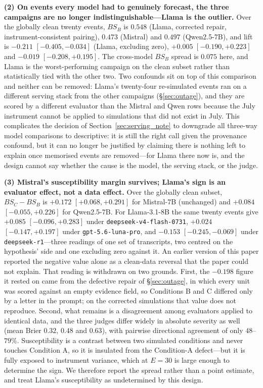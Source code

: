 \documentclass[11pt,journal,onecolumn]{IEEEtran}
\begin{document}
\textbf{(2) On events every model had to genuinely forecast, the three campaigns are no longer indistinguishable---Llama is the outlier.} Over the globally clean twenty events, $BS_B$ is $0.548$ (Llama, corrected repair, instrument-consistent pairing), $0.473$ (Mistral) and $0.497$ (Qwen2.5-7B), and lift is $-0.211$ $[-0.405, -0.034]$ (Llama, excluding zero), $+0.005$ $[-0.190, +0.223]$ and $-0.019$ $[-0.208, +0.195]$. The cross-model $BS_B$ spread is $0.075$ here, and Llama is the worst-performing campaign on the clean subset rather than statistically tied with the other two. Two confounds sit on top of this comparison and neither can be removed: Llama's twenty-four re-simulated events ran on a different serving stack from the other campaigns (\S\ref{sec:outage}), and they are scored by a different evaluator than the Mistral and Qwen rows because the July instrument cannot be applied to simulations that did not exist in July. This complicates the decision of Section~\ref{sec:serving_note} to downgrade all three-way model comparisons to descriptive: it is still the right call given the provenance confound, but it can no longer be justified by claiming there is nothing left to explain once memorised events are removed---for Llama there now is, and the design cannot say whether the cause is the model, the serving stack, or the judge.

\textbf{(3) Mistral's susceptibility margin survives; Llama's sign is an evaluator effect, not a data effect.} Over the globally clean subset, $BS_C - BS_B$ is $+0.172$ $[+0.068, +0.291]$ for Mistral-7B (unchanged) and $+0.084$ $[-0.055, +0.226]$ for Qwen2.5-7B. For Llama-3.1-8B the same twenty events give $+0.085$ $[-0.096, +0.283]$ under \texttt{deepseek-v4-flash-0731}, $+0.024$ $[-0.147, +0.197]$ under \texttt{gpt-5.6-luna-pro}, and $-0.153$ $[-0.245, -0.069]$ under \texttt{deepseek-r1}---three readings of one set of transcripts, two centred on the hypothesis' side and one excluding zero against it. An earlier version of this paper reported the negative value alone as a clean-data reversal that the paper could not explain. That reading is withdrawn on two grounds. First, the $-0.198$ figure it rested on came from the defective repair of \S\ref{sec:outage}, in which every unit was scored against an empty evidence field, so Conditions B and C differed only by a letter in the prompt; on the corrected simulations that value does not reproduce. Second, what remains is a disagreement among evaluators applied to identical data, and the three judges differ widely in absolute severity as well (mean Brier $0.32$, $0.48$ and $0.63$), with pairwise directional agreement of only $48$--$79\%$. Susceptibility is a contrast between two simulated conditions and never touches Condition A, so it is insulated from the Condition-A defect---but it is fully exposed to instrument variance, which at $E=30$ is large enough to determine the sign. We therefore report the spread rather than a point estimate, and treat Llama's susceptibility as undetermined by this design.
\end{document}
